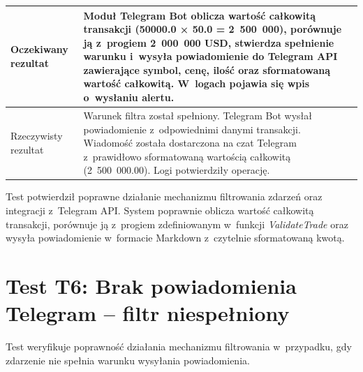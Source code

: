 \begin{table}[H]
\begin{tabular}{|p{}|p{}|}
        Oczekiwany rezultat  & Moduł Telegram Bot oblicza wartość całkowitą transakcji (50000.0 × 50.0 = 2~500~000), porównuje ją z~progiem 2~000~000 USD, stwierdza spełnienie warunku i~wysyła powiadomienie do Telegram API zawierające symbol, cenę, ilość oraz sformatowaną wartość całkowitą. W~logach pojawia się wpis o~wysłaniu alertu.                                                    \\ \hline
        Rzeczywisty rezultat & Warunek filtra został spełniony. Telegram Bot wysłał powiadomienie z~odpowiednimi danymi transakcji. Wiadomość została dostarczona na czat Telegram z~prawidłowo sformatowaną wartością całkowitą (2~500~000.00). Logi potwierdziły operację.                                                                                                                        \\ \hline
    \end{tabular}
\end{table}

Test potwierdził poprawne działanie mechanizmu filtrowania zdarzeń oraz integracji z~Telegram API\@.
System poprawnie oblicza wartość całkowitą transakcji, porównuje ją z~progiem zdefiniowanym w~funkcji
\textit{ValidateTrade} oraz wysyła powiadomienie w~formacie Markdown z~czytelnie sformatowaną kwotą.

\newpage


\section{Test T6: Brak powiadomienia Telegram -- filtr niespełniony}
\label{sec:test_telegram_filter_fail}

Test weryfikuje poprawność działania mechanizmu filtrowania w~przypadku, gdy zdarzenie nie spełnia warunku wysyłania
powiadomienia.

\vspace{0.5cm}


